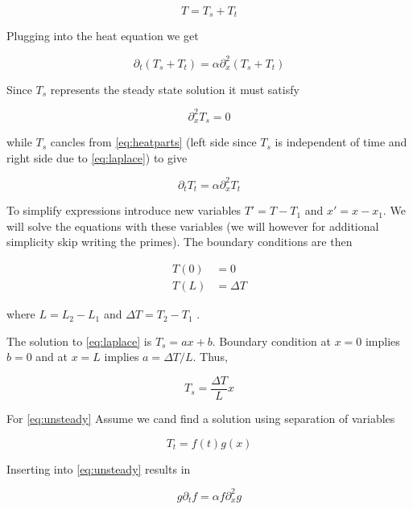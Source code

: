 \documentclass{article}
\begin{document}
\begin{equation}
T = T_s + T_t
\end{equation}

Plugging into the heat equation we get

\begin{equation}
\label{eq:heatparts}
\partial_t (T_s + T_t) = \alpha \partial_x^2 (T_s + T_t)
\end{equation}

Since $T_s$ represents the steady state solution it must satisfy

\begin{equation}
\label{eq:laplace}
\partial_x^2 T_s = 0
\end{equation}

while $T_s$ cancles from \ref{eq:heatparts} (left side since $T_s$ is independent of time and right side due to \ref{eq:laplace}) to give 

\begin{equation}
\label{eq:unsteady}
\partial_t T_t = \alpha \partial_x^2 T_t
\end{equation}

To simplify expressions introduce new variables $T' = T-T_1$ and $x' = x-x_1$. We will solve the equations with these variables (we will however for additional simplicity skip writing the primes). The boundary conditions are then 

\begin{align}
T(0) &= 0 \\
T(L) &= \Delta T
\end{align}

where $L = L_2-L_1$ and $\Delta T = T_2-T_1$ .

The solution to \ref{eq:laplace} is $T_s = ax + b$. Boundary condition at $x = 0$ implies $b=0$ and at $x=L$ implies $ a= \Delta T/L$. Thus,

\begin{equation}
T_s = \frac{\Delta T}{L} x
\end{equation}

For \ref{eq:unsteady}  Assume we cand find a solution using separation of variables

\begin{equation}
T_t = f(t)g(x)
\end{equation}

Inserting into \ref{eq:unsteady} results in

\begin{equation}
g\partial_t f = \alpha f \partial_x^2 g
\end{equation}
\end{document}
